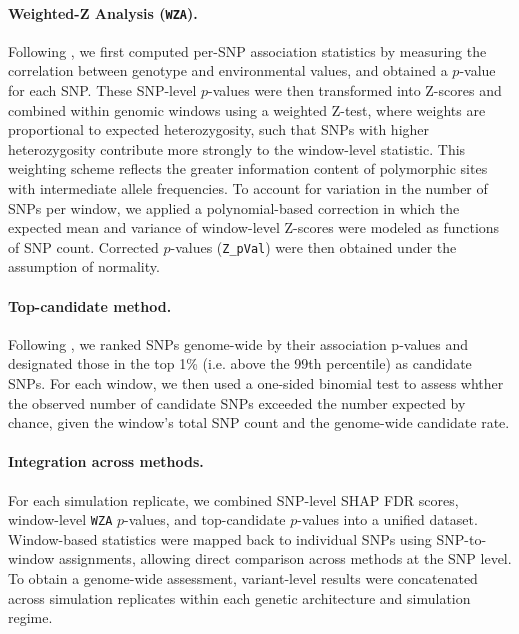 \documentclass[]{article}
\begin{document}
\paragraph{Weighted-Z Analysis (\texttt{WZA}).}
Following \citet{booker_wza_2024},
we first computed per-SNP association statistics
by measuring the correlation
between genotype and environmental values,
and obtained a $p$-value for each SNP.
These SNP-level $p$-values were then transformed
into Z-scores and combined within genomic windows
using a weighted Z-test,
where weights are proportional to expected heterozygosity,
such that SNPs with higher heterozygosity
contribute more strongly to the window-level statistic.
This weighting scheme reflects the greater information content
of polymorphic sites with intermediate allele frequencies.
To account for variation in the number of SNPs per window,
we applied a polynomial-based correction
in which the expected mean and variance
of window-level Z-scores were modeled
as functions of SNP count.
Corrected $p$-values (\texttt{Z\_pVal})
were then obtained under the assumption of normality.

\paragraph{Top-candidate method.}
Following \citet{yeaman_convergent_2016},
we ranked SNPs genome-wide by their association p-values
and designated those in the top 1\% (i.e. above the 99th percentile) 
as candidate SNPs.
For each window, we then used a one-sided binomial test 
to assess whther the observed number of 
candidate SNPs exceeded the number expected by chance, 
given the window's total SNP count and the genome-wide candidate rate. 


\paragraph{Integration across methods.}
For each simulation replicate,
we combined SNP-level SHAP FDR scores,
window-level \texttt{WZA} $p$-values,
and top-candidate $p$-values
into a unified dataset.
Window-based statistics were mapped back to individual SNPs
using SNP-to-window assignments,
allowing direct comparison across methods
at the SNP level.
To obtain a genome-wide assessment,
variant-level results were concatenated
across simulation replicates
within each genetic architecture
and simulation regime.
\end{document}
